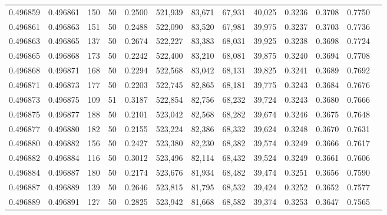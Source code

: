 \begin{tabular}{rrrrrrrrrrrrr}
0.496859 & 0.496861 &   150 &  50 &                                     0.2500 & 521,939 &  83,671 &  67,931 &  40,025 & 0.3236 & 0.3708 & 0.7750 \\
0.496861 & 0.496863 &   151 &  50 &                                     0.2488 & 522,090 &  83,520 &  67,981 &  39,975 & 0.3237 & 0.3703 & 0.7736 \\
0.496863 & 0.496865 &   137 &  50 &                                     0.2674 & 522,227 &  83,383 &  68,031 &  39,925 & 0.3238 & 0.3698 & 0.7724 \\
0.496865 & 0.496868 &   173 &  50 &                                     0.2242 & 522,400 &  83,210 &  68,081 &  39,875 & 0.3240 & 0.3694 & 0.7708 \\
0.496868 & 0.496871 &   168 &  50 &                                     0.2294 & 522,568 &  83,042 &  68,131 &  39,825 & 0.3241 & 0.3689 & 0.7692 \\
0.496871 & 0.496873 &   177 &  50 &                                     0.2203 & 522,745 &  82,865 &  68,181 &  39,775 & 0.3243 & 0.3684 & 0.7676 \\
0.496873 & 0.496875 &   109 &  51 &                                     0.3187 & 522,854 &  82,756 &  68,232 &  39,724 & 0.3243 & 0.3680 & 0.7666 \\
0.496875 & 0.496877 &   188 &  50 &                                     0.2101 & 523,042 &  82,568 &  68,282 &  39,674 & 0.3246 & 0.3675 & 0.7648 \\
0.496877 & 0.496880 &   182 &  50 &                                     0.2155 & 523,224 &  82,386 &  68,332 &  39,624 & 0.3248 & 0.3670 & 0.7631 \\
0.496880 & 0.496882 &   156 &  50 &                                     0.2427 & 523,380 &  82,230 &  68,382 &  39,574 & 0.3249 & 0.3666 & 0.7617 \\
0.496882 & 0.496884 &   116 &  50 &                                     0.3012 & 523,496 &  82,114 &  68,432 &  39,524 & 0.3249 & 0.3661 & 0.7606 \\
0.496884 & 0.496887 &   180 &  50 &                                     0.2174 & 523,676 &  81,934 &  68,482 &  39,474 & 0.3251 & 0.3656 & 0.7590 \\
0.496887 & 0.496889 &   139 &  50 &                                     0.2646 & 523,815 &  81,795 &  68,532 &  39,424 & 0.3252 & 0.3652 & 0.7577 \\
0.496889 & 0.496891 &   127 &  50 &                                     0.2825 & 523,942 &  81,668 &  68,582 &  39,374 & 0.3253 & 0.3647 & 0.7565 \\

\end{tabular}
